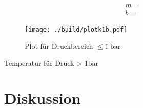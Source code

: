 \begin{align}
    m = \text{} \label{eq:}\\
    b = \text{} \label{eq:}
\end{align}

\begin{figure}
    \centering
    \texttt{[image: ./build/plotk1b.pdf]}
    \caption{Plot für Druckbereich $\leq \SI{1}{\bar}$}
    \label{fig:3}
\end{figure}

\begin{table}
    \centering
    
    \caption{Temperatur für Druck > 1bar}
    \label{tab:2}
\end{table}


\section{Diskussion}


\newpage
\printbibliography


